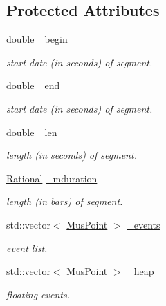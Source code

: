 \subsection*{Protected Attributes}
\begin{DoxyCompactItemize}
\item 
\mbox{\label{classInputSegment_ae5267be6a3c036290ee028d032b4c4fc}} 
double \mbox{\hyperlink{classInputSegment_ae5267be6a3c036290ee028d032b4c4fc}{\+\_\+begin}}
\begin{DoxyCompactList}\small\item\em start date (in seconds) of segment. \end{DoxyCompactList}\item 
\mbox{\label{classInputSegment_a1c6cb6bc0004bc8fa2a1e4667f861f3e}} 
double \mbox{\hyperlink{classInputSegment_a1c6cb6bc0004bc8fa2a1e4667f861f3e}{\+\_\+end}}
\begin{DoxyCompactList}\small\item\em start date (in seconds) of segment. \end{DoxyCompactList}\item 
\mbox{\label{classInputSegment_addcc23fc9ea6a3cb342fd2960b5fbc78}} 
double \mbox{\hyperlink{classInputSegment_addcc23fc9ea6a3cb342fd2960b5fbc78}{\+\_\+len}}
\begin{DoxyCompactList}\small\item\em length (in seconds) of segment. \end{DoxyCompactList}\item 
\mbox{\hyperlink{classRational}{Rational}} \mbox{\hyperlink{classInputSegment_a0ab26fdbc02f67159a8f619254fa7440}{\+\_\+mduration}}
\begin{DoxyCompactList}\small\item\em length (in bars) of segment. \end{DoxyCompactList}\item 
std\+::vector$<$ \mbox{\hyperlink{classMusPoint}{Mus\+Point}} $>$ \mbox{\hyperlink{classInputSegment_ac4494ab7de01a9b0f60cdcede78ac847}{\+\_\+events}}
\begin{DoxyCompactList}\small\item\em event list. \end{DoxyCompactList}\item 
std\+::vector$<$ \mbox{\hyperlink{classMusPoint}{Mus\+Point}} $>$ \mbox{\hyperlink{classInputSegment_a8f5be09886f96f15d6c82a2828bef194}{\+\_\+heap}}
\begin{DoxyCompactList}\small\item\em floating events. \end{DoxyCompactList}\end{DoxyCompactItemize}
